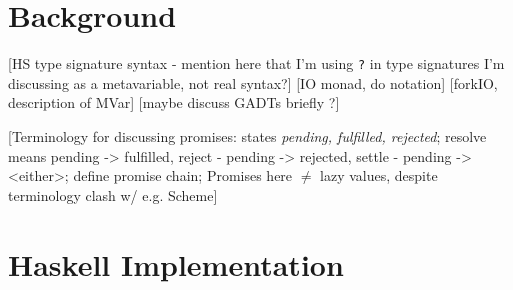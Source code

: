 \documentclass[12pt, english, letterpaper]{kuthesis}
\newcommand{\lit}[1]{\texttt{#1}}
\begin{document}
\chapter{Background}
[HS type signature syntax - mention here that I'm using \lit ? in type signatures I'm discussing as a metavariable, not real syntax?]
[IO monad, do notation]
[forkIO, description of MVar]
[maybe discuss GADTs briefly ?]

[Terminology for discussing promises: states \emph{pending, fulfilled, rejected}; resolve means pending -> fulfilled, reject - pending -> rejected, settle - pending -> <either>; define promise chain; Promises here $\neq$ lazy values, despite terminology clash w/ e.g. Scheme]

\chapter{Haskell Implementation}
\end{document}
